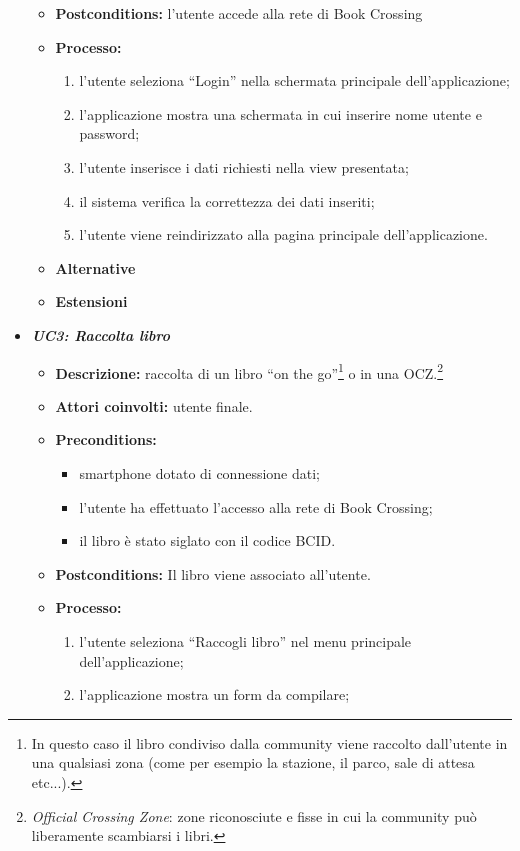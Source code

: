 \begin{itemize}
\begin{itemize}
		\item \textbf{Postconditions:} l’utente accede alla rete di Book Crossing
		\item \textbf{Processo:}
		\begin{enumerate}
			\item l’utente seleziona “Login” nella schermata principale dell’applicazione;
			\item l’applicazione mostra una schermata in cui inserire nome utente e password;
			\item l’utente inserisce i dati richiesti nella view presentata;
			\item il sistema verifica la correttezza dei dati inseriti;
			\item l’utente viene reindirizzato alla pagina principale dell’applicazione.
		\end{enumerate}
		\item \textbf{Alternative}
		\item \textbf{Estensioni}
	\end{itemize}
	\item \textit{\textbf{UC3: Raccolta libro}}
	\begin{itemize}
		\item \textbf{Descrizione:} raccolta di un libro “on the go”\footnote{In questo caso il libro condiviso dalla community viene raccolto dall'utente in una qualsiasi zona (come per esempio la stazione, il parco, sale di attesa etc...).} o in una OCZ.\footnote{\textit{Official Crossing Zone}: zone riconosciute e fisse in cui la community può liberamente scambiarsi i libri.}
		\item \textbf{Attori coinvolti:} utente finale.
		\item \textbf{Preconditions:}
		\begin{itemize}
			\item smartphone dotato di connessione dati;
			\item l’utente ha effettuato l’accesso alla rete di Book Crossing;
			\item il libro è stato siglato con il codice BCID.
		\end{itemize}
		\item \textbf{Postconditions:} Il libro viene associato all’utente.
		\item \textbf{Processo:}
		\begin{enumerate}
			\item l’utente seleziona “Raccogli libro” nel menu principale dell’applicazione;
			\item l’applicazione mostra un form da compilare;

\end{enumerate}
\end{itemize}
\end{itemize}
